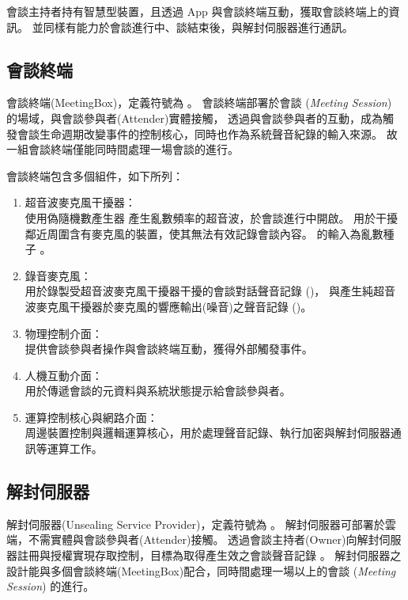     會談主持者持有智慧型裝置，且透過 App 與會談終端互動，獲取會談終端上的資訊。
並同樣有能力於會談進行中、談結束後，與解封伺服器進行通訊。


\subsection{會談終端}

    會談終端(MeetingBox)，定義符號為 \DEFmeetingbox 。
會談終端部署於會談 ({\it Meeting Session}) 的場域，與會談參與者(Attender)實體接觸，
透過與會談參與者的互動，成為觸發會談生命週期改變事件的控制核心，同時也作為系統聲音紀錄的輸入來源。
故一組會談終端僅能同時間處理一場會談的進行。

    會談終端包含多個組件，如下所列：

    \begin{enumerate}
        \item 超音波麥克風干擾器：\\
            使用偽隨機數產生器 \DEFfuncPRNG{} 產生亂數頻率的超音波，於會談進行中開啟。
            用於干擾鄰近周圍含有麥克風的裝置，使其無法有效記錄會談內容。
            \DEFfuncPRNG{} 的輸入為亂數種子 \DEFseed。

        \item 錄音麥克風：\\
            用於錄製受超音波麥克風干擾器干擾的會談對話聲音記錄 (\DEFrecJ)，
            與產生純超音波麥克風干擾器於麥克風的響應輸出(噪音)之聲音記錄 (\DEFrecN)。

        \item 物理控制介面：\\
            提供會談參與者操作與會談終端互動，獲得外部觸發事件。

        \item 人機互動介面：\\
            用於傳遞會談的元資料與系統狀態提示給會談參與者。

        \item 運算控制核心與網路介面：\\
            周邊裝置控制與邏輯運算核心，用於處理聲音記錄、執行加密與解封伺服器通訊等運算工作。
    \end{enumerate}


\subsection{解封伺服器}

    解封伺服器(Unsealing Service Provider)，定義符號為 \DEFserver。
解封伺服器可部署於雲端，不需實體與會談參與者(Attender)接觸。
透過會談主持者(Owner)向解封伺服器註冊與授權實現存取控制，目標為取得產生效之會談聲音記錄 \DEFrecREV。
解封伺服器之設計能與多個會談終端(MeetingBox)配合，同時間處理一場以上的會談 ({\it Meeting Session}) 的進行。


